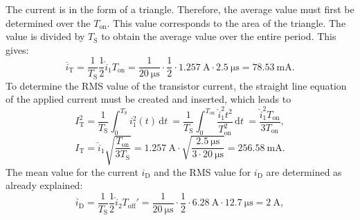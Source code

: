 \begin{solutionblock}
    The current is in the form of a triangle. Therefore, the average value must first be determined over the $T_\mathrm{on}$. This value corresponds to the area of the triangle. The value is divided by $T_\mathrm{S}$ to obtain the average value over the entire period. This gives:
    \begin{equation}
        \overline{i}_\mathrm{T} = \frac{1}{T_\mathrm{S}}\frac{1}{2}\hat i_\mathrm{1}T_\mathrm{on}=\frac{1}{\SI{20}{\micro\s}}\cdot\frac{1}{2}\cdot\SI{1.257}{\ampere}\cdot\SI{2.5}{\micro\s}=\SI{78.53}{\milli\ampere}.
    \end{equation}
    To determine the RMS value of the transistor current, the straight line equation of the applied current must be created and inserted, which leads to
    \begin{equation}
        I_\mathrm{T}^2=\frac{1}{T_\mathrm{S}} \int_{0}^{T_\mathrm{S}} i_\mathrm{1}^2(t) \,\mathrm{d}t \ = \frac{1}{T_\mathrm{S}}\int_{0}^{T_\mathrm{on}} \frac{\hat i_\mathrm{1}^2t^2}{T_\mathrm{on}^2} \,\mathrm{d}t \ =  \frac{\hat i_\mathrm{1}^2T_\mathrm{on}}{3T_\mathrm{on}},
    \end{equation}
    \begin{equation}
        I_\mathrm{T} = \hat i_\mathrm{1} \sqrt{\frac{T_\mathrm{on}}{3T_\mathrm{S}}}= \SI{1.257}{\ampere}\cdot\sqrt{\frac{\SI{2.5}{\micro\s}}{3\cdot\SI{20}{\micro\s}}}= \SI{256.58}{\milli\ampere}.
    \end{equation}
    The mean value for the current $i_\mathrm{D}$ and the RMS value for  $i_\mathrm{D}$ are determined as already explained:
    \begin{equation}
        \overline{i}_\mathrm{D} = \frac{1}{T_\mathrm{S}}\frac{1}{2}\hat i_\mathrm{2}T_\mathrm{off}'=\frac{1}{\SI{20}{\micro\s}}\cdot\frac{1}{2}\cdot\SI{6.28}{\ampere}\cdot\SI{12.7}{\micro\s}=\SI{2}{\ampere},
    \end{equation}


\end{solutionblock}
